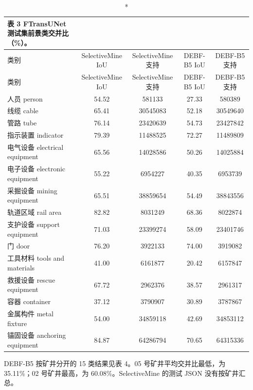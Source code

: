 \documentclass[11pt]{article}
\begin{document}
{\footnotesize\setlength{\tabcolsep}{3pt}
\begin{longtable}{lcccc}
\caption*{表 3  FTransUNet 测试集前景类交并比（\%）。}\\
\toprule
类别 & SelectiveMine IoU & SelectiveMine 支持 & DEBF-B5 IoU & DEBF-B5 支持\\
\midrule
\endfirsthead
\toprule
类别 & SelectiveMine IoU & SelectiveMine 支持 & DEBF-B5 IoU & DEBF-B5 支持\\
\midrule
\endhead
人员 person & 54.52 & 581133 & 27.33 & 580389\\
线缆 cable & 65.41 & 30545083 & 52.18 & 30549640\\
管路 tube & 76.14 & 23420639 & 54.73 & 23427842\\
指示装置 indicator & 79.39 & 11488525 & 72.27 & 11489809\\
电气设备 electrical equipment & 65.56 & 14028586 & 50.26 & 14025884\\
电子设备 electronic equipment & 55.22 & 6954227 & 40.35 & 6953739\\
采掘设备 mining equipment & 65.51 & 38859654 & 54.49 & 38843556\\
轨道区域 rail area & 82.82 & 8031249 & 68.36 & 8022874\\
支护设备 support equipment & 71.03 & 23399274 & 58.09 & 23401746\\
门 door & 76.20 & 3922133 & 74.00 & 3919082\\
工具材料 tools and materials & 41.00 & 6161877 & 20.42 & 6157847\\
救援设备 rescue equipment & 67.72 & 2962376 & 38.57 & 2961317\\
容器 container & 37.12 & 3790907 & 30.89 & 3787867\\
金属构件 metal fixture & 54.00 & 34859118 & 42.69 & 34853112\\
锚固设备 anchoring equipment & 84.87 & 64286794 & 70.65 & 64315336\\
\bottomrule
\end{longtable}
}
DEBF-B5 按矿井分开的 15 类结果见表 4。05 号矿井平均交并比最低，为 35.11\%；02 号矿井最高，为 60.08\%。SelectiveMine 的测试 JSON 没有按矿井汇总。
\end{document}
